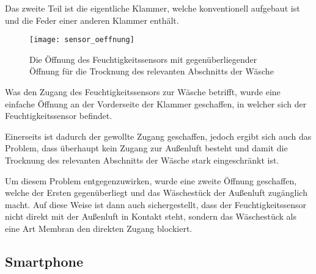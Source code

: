 Das zweite Teil ist die eigentliche Klammer, welche konventionell aufgebaut ist und die Feder einer anderen Klammer enthält.

\begin{figure}[H] 
	\centerline{\texttt{[image: sensor\_oeffnung]}}
	\caption{Die Öffnung des Feuchtigkeitssensors mit gegenüberliegender Öffnung für die Trocknung des relevanten Abschnitts der Wäsche}
	\label{sensor_oeffnung}
\end{figure}

Was den Zugang des Feuchtigkeitssensors zur Wäsche betrifft, wurde eine einfache Öffnung an der Vorderseite der Klammer geschaffen, in welcher sich der Feuchtigkeitssensor befindet.

Einerseits ist dadurch der gewollte Zugang geschaffen, jedoch ergibt sich auch das Problem, dass überhaupt kein Zugang zur Außenluft besteht und damit die Trocknung des relevanten Abschnitts der Wäsche stark eingeschränkt ist.

Um diesem Problem entgegenzuwirken, wurde eine zweite Öffnung geschaffen, welche der Ersten gegenüberliegt und das Wäschestück der Außenluft zugänglich macht. Auf diese Weise ist dann auch sichergestellt, dass der Feuchtigkeitssensor nicht direkt mit der Außenluft in Kontakt steht, sondern das Wäschestück als eine Art Membran den direkten Zugang blockiert.

\newpage
\subsection{Smartphone}